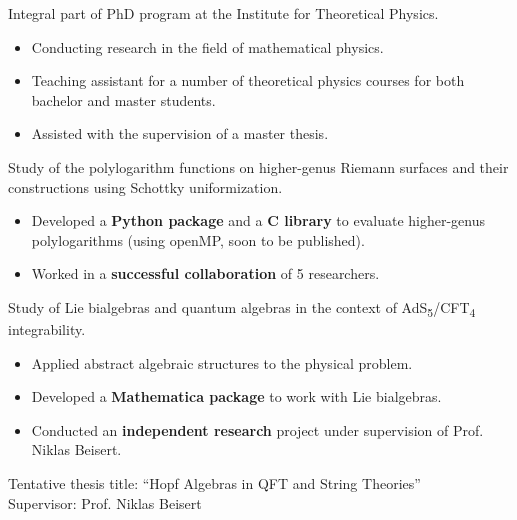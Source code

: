 \documentclass[10pt,a4paper,ragged2e,withhyper]{altacv}
\newcommand{\highlight}[1]{{\color{ETHBlue120}\textbf{#1}}}
\begin{document}
\begin{paracol}{2}

Integral part of PhD program at the Institute for Theoretical Physics.
\begin{itemize}
  \item Conducting research in the field of mathematical physics.
  \item Teaching assistant for a number of theoretical physics courses for both bachelor and master students.
  \item Assisted with the supervision of a master thesis.
\end{itemize}


\vspace{-0.25em}
Study of the polylogarithm functions on higher-genus Riemann surfaces and their 
constructions using Schottky uniformization.
\begin{itemize}
  \item Developed a \highlight{Python package} and a \highlight{C library} to evaluate higher-genus polylogarithms (using openMP, soon to be published).
  \item Worked in a \highlight{successful collaboration} of 5 researchers.
\end{itemize}

\medskip

\vspace{-0.25em}
Study of Lie bialgebras and quantum algebras in the context of AdS\textsubscript{5}/CFT\textsubscript{4} integrability.
\begin{itemize}
\item Applied abstract algebraic structures to the physical problem.
\item Developed a \highlight{Mathematica package} to work with Lie bialgebras.
\item Conducted an \highlight{independent research} project under supervision of Prof. Niklas Beisert.
\end{itemize}


{\color{ETHBlue80}Tentative thesis title:} ``Hopf Algebras in QFT and String Theories''\\
{\color{ETHBlue80}Supervisor:} Prof. Niklas Beisert


\end{paracol}
\end{document}
